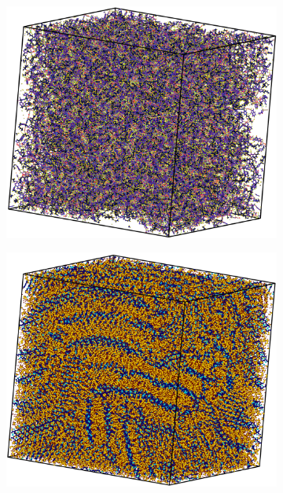\begin{figure}
\centering
\begin{subfigure}{.5\textwidth}
    \includegraphics[width=\textwidth]{figures/consistent-color-itic.png}
\end{subfigure}%
\begin{subfigure}{.5\textwidth}
    \includegraphics[width=\textwidth]{figures/consistent-color-p3ht.png}
\end{subfigure}
\\

\end{figure}
